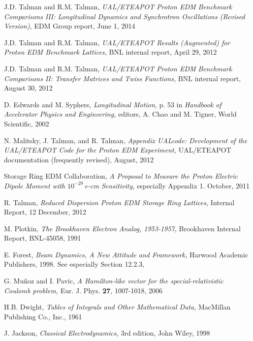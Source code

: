 \documentclass[]{article}
\begin{document}
%
\begin{thebibliography}{99}
J.D. Talman and R.M. Talman, \emph{ UAL/ETEAPOT Proton EDM 
Benchmark Comparisons III: Longitudinal Dynamics 
and Synchrotron Oscillations (Revised Version),} 
EDM Group report, June 1, 2014

J.D. Talman and R.M. Talman, \emph{ UAL/ETEAPOT Results 
(Augmented) for Proton EDM Benchmark Lattices,} BNL internal
report, April 29, 2012

J.D. Talman and R.M. Talman, \emph{ UAL/ETEAPOT Proton EDM 
Benchmark Comparisons II: Transfer Matrices and Twiss Functions,} 
BNL internal report, August 30, 2012

D. Edwards and M. Syphers, \emph{Longitudinal Motion,}
p. 53 in \emph{Handbook of Accelerator Physics and Engineering,}
editors, A. Chao and M. Tigner, World Scientific, 2002

N. Malitsky, J. Talman, and R. Talman, \emph{Appendix UALcode: Development of the
UAL/ETEAPOT Code for the Proton EDM Experiment,} UAL/ETEAPOT documentation
(frequently revised), August, 2012

Storage Ring EDM Collaboration, \emph{A Proposal to Measure the
Proton Electric Dipole Moment with $10^{-29}\,$e-cm Sensitivity,}
especially Appendix 1. October, 2011

R. Talman, \emph{Reduced Dispersion Proton EDM Storage Ring Lattices,}
Internal Report, 12 December, 2012

M. Plotkin, \emph{The Brookhaven Electron Analog, 1953-1957,} 
Brookhaven Internal Report, BNL-45058, 1991

E. Forest, \emph{Beam Dynamics, A New Attitude and Framework,} 
Harwood Academic Publishers, 1998. See especially 
Section 12.2.3,

G. Mu\~{n}oz and I. Pavic, \emph{A Hamilton-like vector for
the special-relativistic Coulomb problem,} 
Eur. J. Phys. {\bf 27}, 1007-1018, 2006

H.B. Dwight, \emph{Tables of Integrals and Other Mathematical Data,} MacMillan 
Publishing Co., Inc., 1961

J. Jackson, \emph{Classical Electrodynamics,} 3rd edition,
John Wiley, 1998

\end{thebibliography}
\end{document}
